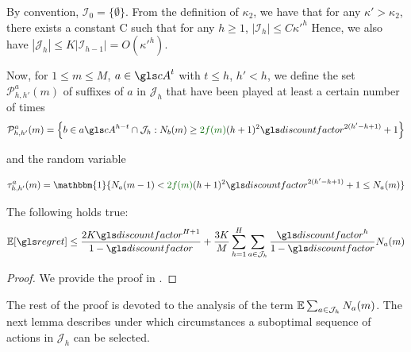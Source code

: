 By convention, $\mathcal{I}_0 = \{\emptyset\}$. From the definition of $\kappa_2$, we have that for any $\kappa'>\kappa_2$, there exists a constant C such that for any $h \geq 1$,
$|\mathcal{I}_h| \leq C {\kappa'}^h$
Hence, we also have $|\mathcal{J}_h| \leq K|\mathcal{I}_{h-1}| = O({\kappa'}^h)$.

Now, for $1\leq m \leq M$, $a \in \cA^t$ with $t \leq h$, $h'<h$, we define the set $\mathcal{P}^a_{h,h'}(m)$ of suffixes of $a$ in $\mathcal{J}_h$ that have been played at least a certain number of times
\begin{equation*}
\mathcal{P}^a_{h,h'}(m) = \left\{ b\in a \cA^{h-t}\cap \mathcal{J}_h : N_b(m) \geq \diff{2f(m)}(h+1)^2\discount^{2(h'-h+1)} + 1 \right\}
\end{equation*}

and the random variable

\begin{equation*}
\tau^a_{h,h'}(m) = \mathbbm{1}\{N_a(m-1) < \diff{2f(m)}(h+1)^2\discount^{2(h'-h+1)} + 1 \leq N_a(m)\}
\end{equation*}

\begin{lemma}
	\label{lemma:expected-regret}
	\begin{leftbar}[lemmabar]
	The following holds true:
	\begin{equation*}
	\expectedvalue [\regret] \leq \frac{2K \discount^{H+1}}{1-\discount} +\frac{3K}{M}\sum_{h=1}^H\sum_{a\in\mathcal{J}_h}\frac{\discount^h}{1-\discount}N_a(m)
	\end{equation*}
	\end{leftbar}
\end{lemma}
\begin{proof}
	We provide the proof in .
\end{proof}


The rest of the proof is devoted to the analysis of the term $\operatorname*{\mathbb{E}} \sum_{a\in \mathcal{J}_h} N_a(m)$. The next lemma describes under which circumstances a suboptimal sequence of actions in $\mathcal{J}_h$ can be selected.

